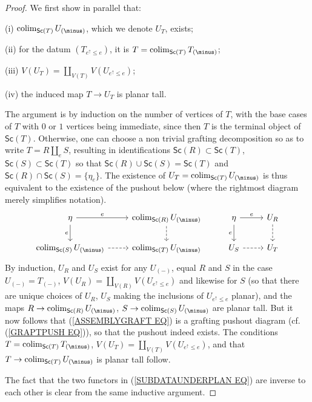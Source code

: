 \documentclass[a4paper,10pt]{article}%
\begin{document}
\begin{proof}
We first show in parallel that:
\begin{inparaenum}
\item[(i)] $\colim_{\mathsf{Sc}(T)} U_{(\minus)}$, which we denote $U_T$, exists;
\item[(ii)] for the datum $\left(T_{e^{\uparrow}\leq e}\right)$, it is $T = \colim_{\mathsf{Sc}(T)} T_{(\minus)}$;
\item[(iii)] $V(U_T) = \coprod_{V(T)} V(U_{e^{\uparrow} \leq e})$;
\item[(iv)] the induced map
$T \to U_T$ is planar tall.
\end{inparaenum}
 
The argument is by induction on the number of vertices of $T$, with the base cases of $T$ with $0$ or $1$ vertices being immediate, since then $T$ is the terminal object of $\mathsf{Sc}(T)$.
Otherwise, one can choose a non trivial grafting decomposition so as to write $T = R \amalg_e S$, resulting 
in identifications 
$\mathsf{Sc}(R) \subset \mathsf{Sc}(T)$, 
$\mathsf{Sc}(S) \subset \mathsf{Sc}(T)$
so that 
$\mathsf{Sc}(R) \cup \mathsf{Sc}(S) = \mathsf{Sc}(T)$
and 
$\mathsf{Sc}(R) \cap \mathsf{Sc}(S) = \{\eta_e \}$.
The existence of $U_T = \colim_{\mathsf{Sc}(T)}U_{(\minus)}$
is thus equivalent to the existence of the pushout below
(where the rightmost diagram merely simplifies notation).
\begin{equation}\label{ASSEMBLYGRAFT EQ}
\begin{tikzcd}
	\eta \ar{r}{e} \ar{d}[swap]{e} & \colim_{\mathsf{Sc}(R)}U_{(\minus)} \ar[dashed,d] &
	\eta \ar{r}{e} \ar{d}[swap]{e} & U_R \ar[dashed,d]	
\\
	\colim_{\mathsf{Sc}(S)}U_{(\minus)} \ar[dashed,r] &
	\colim_{\mathsf{Sc}(T)}U_{(\minus)} &
	U_S \ar[dashed,r] &
	U_T
\end{tikzcd}
\end{equation}
By induction, $U_R$ and $U_S$ exist for any $U_{(\minus)}$, 
equal $R$ and $S$ in the case $U_{(\minus)} = T_{(\minus)}$,
$V(U_R) = \coprod_{V(R)} V(U_{e^{\uparrow} \leq e})$
and likewise for $S$ (so that there are unique choices of $U_R$, $U_S$ making the inclusions of $U_{e^{\uparrow} \leq e}$ planar),
and the maps 
$R \to \colim_{\mathsf{Sc}(R)}U_{(\minus)}$,
$S \to \colim_{\mathsf{Sc}(S)}U_{(\minus)}$
are planar tall.
But it now follows that (\ref{ASSEMBLYGRAFT EQ}) is a grafting pushout diagram (cf. (\ref{GRAPTPUSH EQ})), so that the pushout indeed exists. The conditions
$T = \colim_{\mathsf{Sc}(T)}T_{(\minus)}$,
$V(U_T) = \coprod_{V(T)} V(U_{e^{\uparrow} \leq e})$, 
and that
$T \to \colim_{\mathsf{Sc}(T)}U_{(\minus)}$
is planar tall follow.

The fact that the two functors in (\ref{SUBDATAUNDERPLAN EQ})
are inverse to each other is clear from the same inductive argument.
\end{proof}
\end{document}
